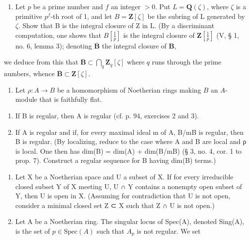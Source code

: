 \begin{enumerate}
\def\labelenumi{\arabic{enumi})}
\setcounter{enumi}{12}
\tightlist
\item
  Let \(p\) be a prime number and \(f\) an integer \(> 0\). Put \(L = \mathbf{Q}(\zeta)\), where \(\zeta\) is a primitive \(p^f\)-th root of 1, and let \(B = \mathbf{Z}[\zeta]\) be the subring of L generated by \(\zeta\). Show that B is the integral closure of Z in L. (By a discriminant computation, one shows that \(B\left[\frac{1}{p}\right]\) is the integral closure of \(\mathbf{Z}\left[\frac{1}{p}\right]\) (V, § 1, no. 6, lemma 3); denoting \(\overline{\mathbf{B}}\) the integral closure of \(\mathbf{B}\),
\end{enumerate}

we deduce from this that \(\overline{\mathbf{B}}\subset\bigcap_{q}\mathbf{Z}_{q}[\zeta]\) where \(q\) runs through the prime numbers, whence \(\overline{\mathbf{B}}\subset\mathbf{Z}[\zeta].\)

\begin{enumerate}
\def\labelenumi{\arabic{enumi})}
\setcounter{enumi}{13}
\tightlist
\item
  Let \(\rho: A \to B\) be a homomorphism of Noetherian rings making \(B\) an \(A\)-module that is faithfully flat.
\end{enumerate}

\begin{enumerate}
\def\labelenumi{\alph{enumi})}
\item
  If B is regular, then A is regular (cf. p. 94, exercises 2 and 3).
\item
  If A is regular and if, for every maximal ideal m of A, B/mB is regular, then B is regular. (By localizing, reduce to the case where A and B are local and ρ is local. One then has dim(B) = dim(A) + dim(B/mB) (§ 3, no. 4, cor. 1 to prop. 7). Construct a regular sequence for B having dim(B) terms.)
\end{enumerate}

\begin{enumerate}
\def\labelenumi{\arabic{enumi})}
\setcounter{enumi}{14}
\item
  Let X be a Noetherian space and U a subset of X. If for every irreducible closed subset Y of X meeting U, U ∩ Y contains a nonempty open subset of Y, then U is open in X. (Assuming for contradiction that U is not open, consider a minimal closed set Z ⊂ X such that Z ∩ U is not open.)
\item
  Let A be a Noetherian ring. The singular locus of Spec(A), denoted Sing(A), is the set of \(p \in \text{Spec}(A)\) such that \(A_p\) is not regular. We set
\end{enumerate}

